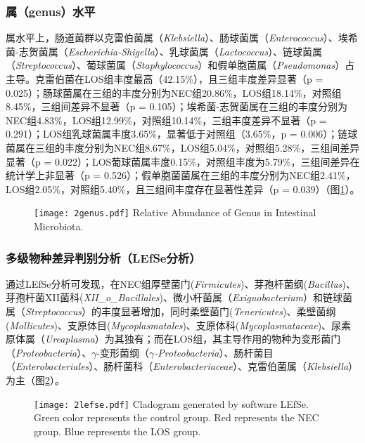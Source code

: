 {{    \subsubsection{属（genus）水平}
    属水平上，肠道菌群以克雷伯菌属（\textit{Klebsiella}）、肠球菌属（\textit{Enterococcus}）、埃希菌-志贺菌属（\textit{Escherichia-Shigella}）、乳球菌属（\textit{Lactococcus}）、链球菌属（\textit{Streptococcus}）、葡球菌属（\textit{Staphylococcus}）和假单胞菌属（\textit{Pseudomonas}）占主导。克雷伯菌在LOS组丰度最高（42.15\%），且三组丰度差异显著（p = 0.025）；肠球菌属在三组的丰度分别为NEC组20.86\%，LOS组18.14\%，对照组8.45\%，三组间差异不显著（p = 0.105）；埃希菌-志贺菌属在三组的丰度分别为NEC组4.83\%，LOS组12.99\%，对照组10.14\%，三组丰度差异不显著（p = 0.291）；LOS组乳球菌属丰度3.65\%，显著低于对照组（3.65\%，p = 0.006）；链球菌属在三组的丰度分别为NEC组8.67\%，LOS组5.04\%，对照组5.28\%，三组间差异显著（p = 0.022）；LOS葡球菌属丰度0.15\%，对照组丰度为5.79\%，三组间差异在统计学上非显著（p = 0.526）；假单胞菌菌属在三组的丰度分别为NEC组2.41\%，LOS组2.05\%，对照组5.40\%，且三组间丰度存在显著性差异（p = 0.039）（图\ref{fig:2genus}）。
      \begin{figure}[!htp]
        \centering
        \texttt{[image: 2genus.pdf]}
          {Relative Abundance of Genus in Intestinal Microbiota.}
        \label{fig:2genus}
      \end{figure}

      \subsubsection{多级物种差异判别分析（LEfSe分析）}
      通过LEfSe分析可发现，在NEC组厚壁菌门(\textit{Firmicutes})、芽孢杆菌纲(\textit{Bacillus})、芽孢杆菌XII菌科(\textit{XII\_o\_Bacillales})、微小杆菌属（\textit{Exiguobacterium}）和链球菌属（\textit{Streptococcus}）的丰度显著增加，同时柔壁菌门(\textit{Tenericutes})、柔壁菌纲(\textit{Mollicutes})、支原体目(\textit{Mycoplasmatales})、支原体科(\textit{Mycoplasmataceae})、尿素原体属（\textit{Ureaplasma}）为其独有；而在LOS组，其主导作用的物种为变形菌门（\textit{Proteobacteria}）、$\gamma$-变形菌纲（\textit{$\gamma$-Proteobacteria}）、肠杆菌目（\textit{Enterobacteriales}）、肠杆菌科（\textit{Enterobacteriaceae}）、克雷伯菌属（\textit{Klebsiella}）为主（图\ref{fig:2lefse}）。
        \begin{figure}[!htp]
          \centering
          \texttt{[image: 2lefse.pdf]}
            {Cladogram generated by software LEfSe. Green color represents the control group. Red represents the NEC group. Blue represents the LOS group.}
          \label{fig:2lefse}
        \end{figure}

}}
